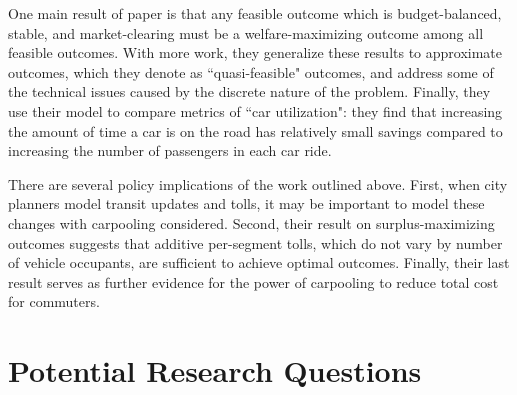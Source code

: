 \documentclass[JEL]{AEA}
\begin{document}
One main result of \cite{ostrovsky-2018} paper is that any feasible outcome which is budget-balanced, stable, and market-clearing must be a welfare-maximizing outcome among all feasible outcomes. With more work, they generalize these results to approximate outcomes, which they denote as ``quasi-feasible" outcomes, and address some of the technical issues caused by the discrete nature of the problem. Finally, they use their model to compare metrics of ``car utilization": they find that increasing the amount of time a car is on the road has relatively small savings compared to increasing the number of passengers in each car ride.

There are several policy implications of the work outlined above. First, when city planners model transit updates and tolls, it may be important to model these changes with carpooling considered. Second, their result on surplus-maximizing outcomes suggests that additive per-segment tolls, which do not vary by number of vehicle occupants, are sufficient to achieve optimal outcomes. Finally, their last result serves as further evidence for the power of carpooling to reduce total cost for commuters.

\section{Potential Research Questions}
\label{research-questions}
\end{document}

